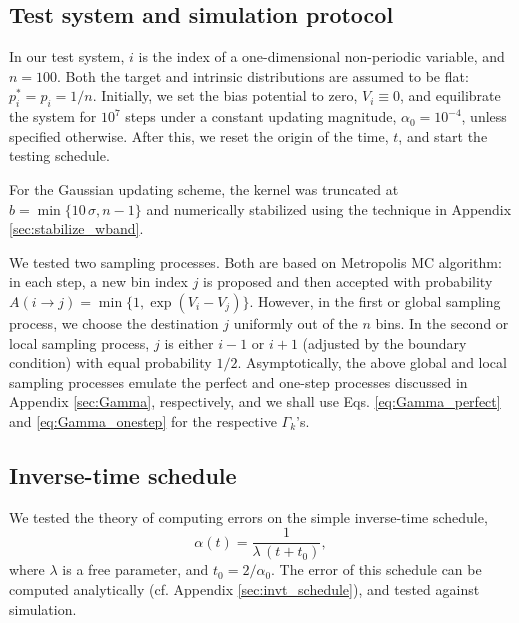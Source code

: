 \documentclass[reprint, floatfix]{revtex4-1}
\begin{document}
\subsection{\label{sec:results_system}
Test system and simulation protocol}


In our test system,
$i$ is the index of a one-dimensional
non-periodic variable,
and $n = 100$.
%
Both the target and intrinsic distributions
are assumed to be flat:
$p^*_i = p_i = 1/n$.
%
%
Initially,
we set the bias potential to zero,
$V_i \equiv 0$,
%
and equilibrate the system for $10^7$ steps
under a constant updating magnitude,
$\alpha_0 = 10^{-4}$,
unless specified otherwise.
%
After this,
we reset the origin of the time, $t$,
and start the testing schedule.


For the Gaussian updating scheme,
the kernel was truncated at
$b = \min\{10 \, \sigma, n - 1\}$
and numerically stabilized
using the technique
in Appendix \ref{sec:stabilize_wband}.



We tested two sampling processes.
%
Both are based on
Metropolis MC algorithm\cite{
  metropolis1953, newman, frenkel,
  landau_binder}:
%
in each step, a new bin index $j$ is proposed
and then accepted with probability
%
$
A(i \to j) = \min\{ 1, \exp(V_i - V_j) \}.
$
However,
in the first or global sampling process,
we choose the destination $j$
uniformly out of the $n$ bins.
%
In the second or local sampling process,
$j$ is either $i - 1$ or $i + 1$
(adjusted by the boundary condition)
with equal probability $1/2$.
%
Asymptotically,
the above global and local sampling processes
emulate the perfect and one-step processes
discussed in Appendix \ref{sec:Gamma},
respectively,
and we shall use
Eqs. \eqref{eq:Gamma_perfect}
and \eqref{eq:Gamma_onestep}
for the respective $\Gamma_k$'s.
%



\subsection{\label{sec:results_invt}
Inverse-time schedule}


We tested the theory of computing errors
on the simple inverse-time schedule,
%
\begin{equation}
\alpha(t) = \frac{1}{\lambda \, (t + t_0) },
\label{eq:alpha_invtlambda}
\end{equation}
%
where $\lambda$ is a free parameter,
and $t_0 = 2/\alpha_0$.
%
The error of this schedule
can be computed analytically
(cf. Appendix \ref{sec:invt_schedule}),
and tested against simulation.
\end{document}
